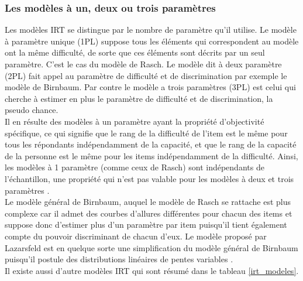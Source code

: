\subsubsection{Les modèles à un, deux ou trois paramètres}
Les modèles IRT se distingue par le nombre de paramètre qu’il utilise. Le modèle à paramètre unique (1PL) suppose tous les éléments qui correspondent au modèle ont la même difficulté, de sorte que ces éléments sont décrits par un seul paramètre. C’est le cas du modèle de Rasch. Le modèle dit à deux paramètre (2PL) fait appel au paramètre de difficulté et de discrimination par exemple le modèle de Birnbaum. Par contre le modèle a trois paramètres (3PL) est celui qui cherche à estimer en plus le paramètre de difficulté et de discrimination, la pseudo chance. \\
Il en résulte des modèles à un paramètre ayant la propriété d'objectivité spécifique, ce qui signifie que le rang de la difficulté de l'item est le même pour tous les répondants indépendamment de la capacité, et que le rang de la capacité de la personne est le même pour les items indépendamment de la difficulté. Ainsi, les modèles à 1 paramètre (comme ceux de Rasch) sont indépendants de l'échantillon, une propriété qui n'est pas valable pour les modèles à deux et trois paramètres \cite{fisher1922mathematical}. \\
Le modèle général de Birnbaum, auquel le modèle de Rasch se rattache est plus complexe car il admet des courbes d’allures différentes pour chacun des items et suppose donc d’estimer plus d’un paramètre par item puisqu’il tient également compte du pouvoir discriminant de chacun d’eux. Le modèle proposé par Lazarsfeld est en quelque sorte une simplification du modèle général de Birnbaum puisqu’il postule des distributions linéaires de pentes variables \cite{yvonnick_2019}. \\
Il existe aussi d’autre modèles IRT qui sont résumé dans le tableau \ref{irt_modeles}.

